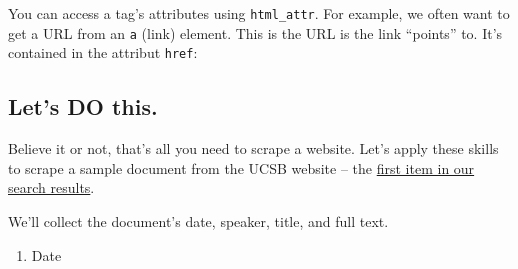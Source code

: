\documentclass[]{book}
\newenvironment{Shaded}{\begin{snugshade}}{\end{snugshade}}
\newcommand{\CommentTok}[1]{\textcolor[rgb]{0.56,0.35,0.01}{\textit{#1}}}
\newcommand{\KeywordTok}[1]{\textcolor[rgb]{0.13,0.29,0.53}{\textbf{#1}}}
\newcommand{\NormalTok}[1]{#1}
\newcommand{\OperatorTok}[1]{\textcolor[rgb]{0.81,0.36,0.00}{\textbf{#1}}}
\newcommand{\StringTok}[1]{\textcolor[rgb]{0.31,0.60,0.02}{#1}}
\providecommand{\tightlist}{%
  \setlength{\itemsep}{0pt}\setlength{\parskip}{0pt}}
\begin{document}
You can access a tag's attributes using \texttt{html\_attr}. For example, we often want to get a URL from an \texttt{a} (link) element. This is the URL is the link ``points'' to. It's contained in the attribut \texttt{href}:

\begin{Shaded}
\end{Shaded}

\hypertarget{lets-do-this.}{%
\subsection{Let's DO this.}\label{lets-do-this.}}

Believe it or not, that's all you need to scrape a website. Let's apply these skills to scrape a sample document from the UCSB website -- the \href{\%22http://www.presidency.ucsb.edu/documents/letter-t-keith-glennan-administrator-national-aeronautics-and-space-administration\%22}{first item in our search results}.

We'll collect the document's date, speaker, title, and full text.

\begin{enumerate}
\def\labelenumi{\arabic{enumi}.}
\tightlist
\item
  Date
\end{enumerate}

\begin{Shaded}
\end{Shaded}
\end{document}
